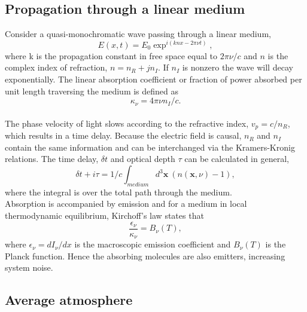 \subsection{Propagation through a linear medium}

Consider a quasi-monochromatic wave passing through a linear medium,
\begin{equation}
E(x,t) = E_0 \exp^{i(knx - 2\pi\nu t)},
\end{equation}		
where k is the propagation constant in free space equal to $2\pi \nu/c$ and $n$ is the complex index of refraction, $n= n_R + j n_I$. If $n_I$ is nonzero the wave will decay exponentially. The linear absorption coefficient or fraction of power absorbed per unit length traversing the medium is defined as 
\begin{equation}
\kappa_\nu = 4\pi \nu n_I/c.
\end{equation}
~\\
The phase velocity of light slows according to the refractive index, $v_p = c/n_R$, which results in a time delay.  Because the electric field is causal, $n_R$ and $n_I$ contain the same information and can be interchanged via the Kramers-Kronig relations. The time delay, $\delta t$ and optical depth $\tau$ can be calculated in general,
\begin{equation}\label{timedelay}
\delta t + i \tau =1/c \int_{medium} d^3\mathbf{x}\  (n(\mathbf{x}, \nu) -1),
\end{equation}
where the integral is over the total path through the medium.
~\\
Absorption is accompanied by emission and for a medium in local thermodynamic equilibrium, Kirchoff's law states that 
\begin{equation}\label{kirchoff}
\frac{\epsilon_\nu}{\kappa_\nu}=B_\nu(T),
\end{equation}
where $\epsilon_\nu = dI_\nu/dx$ is the macroscopic emission coefficient and $B_\nu(T)$ is the Planck function. Hence the absorbing molecules are also emitters, increasing system noise.\\


\subsection{Average atmosphere}

